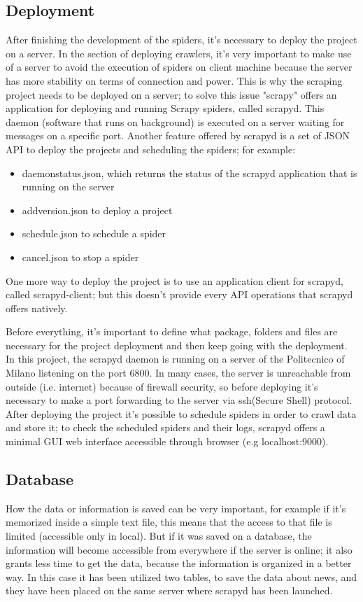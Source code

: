 \subsection{Deployment}
After finishing the development of the spiders, it's necessary to deploy the project on a server. 
In the section of deploying crawlers, it's very important to make use of a server to avoid the execution of spiders on client machine because the server has more stability on terms of connection and power. 
This is why the scraping project needs to be deployed on a server; to solve this issue "scrapy" offers an application for deploying and running Scrapy spiders, called scrapyd\cite{scrapyd}. 
This daemon (software that runs on background) is executed on a server waiting for messages on a specific port. 
Another feature offered by scrapyd is a set of JSON API to deploy the projects and scheduling the spiders; for example:
\begin{itemize}
	\item daemonstatus.json, which returns the status of the scrapyd application that is running on the server
	\item addversion.json to deploy a project
	\item schedule.json to schedule a spider
	\item cancel.json to stop a spider
\end{itemize}
One more way to deploy the project is to use an application client for scrapyd, called scrapyd-client\cite{scrapydclient}; but this doesn't provide every API operations that scrapyd offers natively.
\par
Before everything, it's important to define what package, folders and files are necessary for the project deployment and then keep going with the deployment. 
In this project, the scrapyd daemon is running on a server of the Politecnico of Milano listening on the port 6800. 
In many cases, the server is unreachable from outside (i.e. internet) because of firewall security, so before deploying it's necessary to make a port forwarding to the server via ssh(Secure Shell)\cite{ssh} protocol. 
After deploying the project it's possible to schedule spiders in order to crawl data and store it; to check the scheduled spiders and their logs, scrapyd offers a minimal GUI web interface accessible through browser (e.g localhost:9000).
\subsection{Database}
How the data or information is saved can be very important, for example if it's memorized inside a simple text file, this means that the access to that file is limited (accessible only in local). 
But if it was saved on a database, the information will become accessible from everywhere if the server is online; it also grants less time to get the data, because the information is organized in a better way.
In this case it has been utilized two tables, to save the data about news, and they have been placed on the same server where scrapyd has been launched.